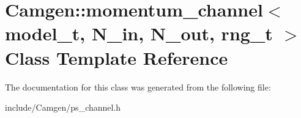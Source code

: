 \hypertarget{a00374}{}\section{Camgen\+:\+:momentum\+\_\+channel$<$ model\+\_\+t, N\+\_\+in, N\+\_\+out, rng\+\_\+t $>$ Class Template Reference}
\label{a00374}


The documentation for this class was generated from the following file\+:\begin{DoxyCompactItemize}
\item 
include/\+Camgen/ps\+\_\+channel.\+h\end{DoxyCompactItemize}
